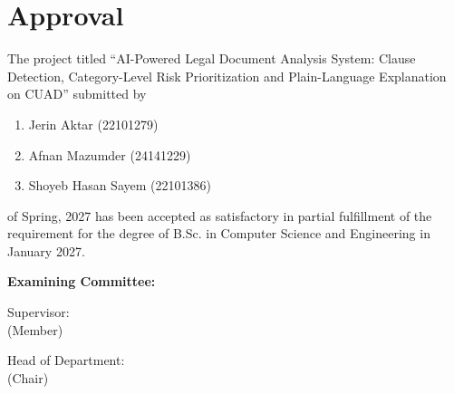 \section*{Approval}

The project titled ``AI-Powered Legal Document Analysis System: Clause Detection, Category-Level Risk Prioritization and Plain-Language Explanation on CUAD'' submitted by
\begin{enumerate}
  \item Jerin Aktar (22101279)
  \item Afnan Mazumder (24141229)
  \item Shoyeb Hasan Sayem (22101386)
\end{enumerate}

of Spring, 2027 has been accepted as satisfactory in partial fulfillment of the requirement for the degree of B.Sc. in Computer Science and Engineering in January 2027.

\vspace{0.5cm}
\textbf{Examining Committee:}

\vspace{1cm}

Supervisor:\\
(Member)
\begin{center}
    \hspace{7cm}  \hspace{1cm}
\end{center}

Head of Department:\\
(Chair)
\begin{center}
    \hspace{7cm}  \hspace{1cm}
\end{center}

\pagebreak
